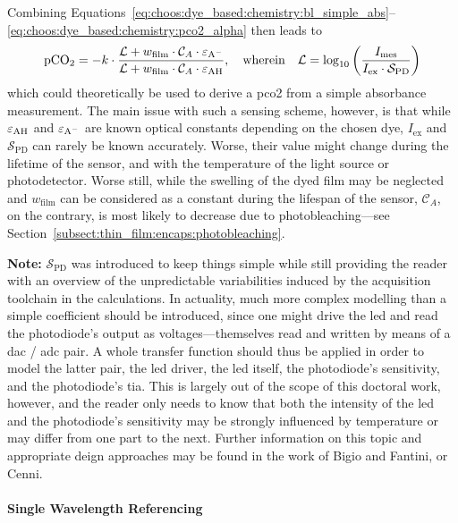 Combining Equations~\ref{eq:choos:dye_based:chemistry:bl_simple_abs}--\ref{eq:choos:dye_based:chemistry:pco2_alpha} then leads to
\begin{equation}
	\ce{pCO_2} = - k \cdot \frac{\mathcal{L} + w_\text{film} \cdot \mathcal{C}_A \ce{\cdot \varepsilon_{A^-}} }{ \mathcal{L} + w_\text{film} \cdot \mathcal{C}_A \cdot \ce{ \varepsilon_{AH}} }, \quad \text{wherein} \quad \mathcal{L} = \log_{10} \left( \frac{I_\text{mes}}{I_\text{ex}\cdot \mathcal{S}_\text{PD}} \right)
\end{equation}
which could theoretically be used to derive a \gls{pco2} from a simple absorbance measurement. The main issue with such a sensing scheme, however, is that while $\ce{\varepsilon_{AH}}$ and $\ce{\varepsilon_{A^-}}$ are known optical constants depending on the chosen dye, $I_\text{ex}$ and $\mathcal{S}_\text{PD}$ can rarely be known accurately. Worse, their value might change during the lifetime of the sensor, and with the temperature of the light source\cite{reynolds1991} or photodetector\cite{ahmad1979}. Worse still, while the swelling of the dyed film may be neglected and $w_\text{film}$ can be considered as a constant during the lifespan of the sensor, $\mathcal{C}_A$, on the contrary, is most likely to decrease due to photobleaching---see Section~\ref{subsect:thin_film:encaps:photobleaching}.

\textbf{Note:} $\mathcal{S}_\text{PD}$ was introduced to keep things simple while still providing the reader with an overview of the unpredictable variabilities induced by the acquisition toolchain in the calculations. In actuality, much more complex modelling than a simple coefficient should be introduced, since one might drive the \gls{led} and read the photodiode's output as voltages---themselves read and written by means of a \gls{dac} / \gls{adc} pair. A whole transfer function should thus be applied in order to model the latter pair, the \gls{led} driver, the \gls{led} itself, the photodiode's sensitivity, and the photodiode's \gls{tia}. This is largely out of the scope of this doctoral work, however, and the reader only needs to know that both the intensity of the \gls{led} and the photodiode's sensitivity may be strongly influenced by temperature or may differ from one part to the next. Further information on this topic and appropriate deign approaches may be found in the work of Bigio and Fantini\cite[Chap.~13]{bigio2016}, or Cenni\cite{cenni2012}.

\paragraph{Single Wavelength Referencing}\mbox{}\\


